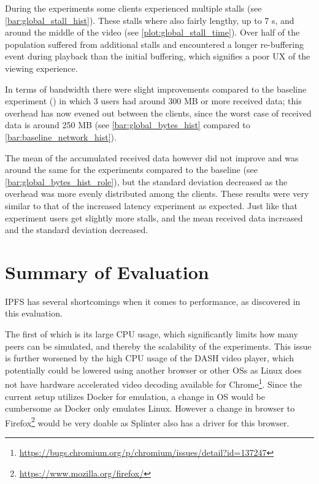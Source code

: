 During the experiments some clients experienced multiple stalls (see \autoref{bar:global_stall_hist}). These stalls where also fairly lengthy, up to 7 \ac{s}, and around the middle of the video (see \autoref{plot:global_stall_time}). Over half of the population suffered from additional stalls and encountered a longer re-buffering event during playback than the initial buffering, which signifies a poor \ac{UX} of the viewing experience.

\if{}


\fi

In terms of bandwidth there were slight improvements compared to the baseline experiment () in which 3 users had around 300 \ac{MB} or more received data; this overhead has now evened out between the clients, since the worst case of received data is around 250 \ac{MB} (see \autoref{bar:global_bytes_hist} compared to \autoref{bar:baseline_network_hist}).

The mean of the accumulated received data however did not improve and was around the same for the experiments compared to the baseline (see \autoref{bar:global_bytes_hist_role}), but the standard deviation decreased as the overhead was more evenly distributed among the clients.
These results were very similar to that of the increased latency experiment as expected. Just like that experiment users get slightly more stalls, and the mean received data increased and the standard deviation decreased.

\if{}


\fi


\FloatBarrier 
\section{Summary of Evaluation}
\ac{IPFS} has several shortcomings when it comes to performance, as discovered in this evaluation.

The first of which is its large \ac{CPU} usage, which significantly limits how many peers can be simulated, and thereby the scalability of the experiments.
This issue is further worsened by the high \ac{CPU} usage of the \ac{DASH} video player, which potentially could be lowered using another browser or other \acp{OS} as Linux does not have hardware accelerated video decoding available for Chrome\footnote{\url{https://bugs.chromium.org/p/chromium/issues/detail?id=137247}}. Since the current setup utilizes Docker for emulation, a change in \ac{OS} would be cumbersome as Docker only emulates Linux. However a change in browser to Firefox\footnote{\url{https://www.mozilla.org/firefox/}} would be very doable as Splinter also has a driver for this browser.


